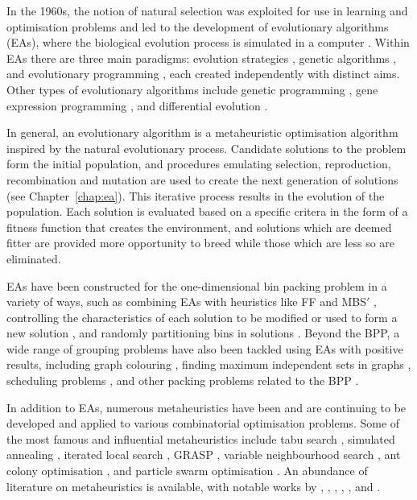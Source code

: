 \documentclass[a4paper,11pt]{article}
\begin{document}
In the 1960s, the notion of natural selection was exploited for use in learning and optimisation problems and led to the development of evolutionary algorithms (EAs), where the biological evolution process is simulated in a computer \citep{back1996, back1997}. Within EAs there are three main paradigms: evolution strategies \citep{schwefel1981}, genetic algorithms \citep{holland1962c, holland1962o, holland1975, goldberg1989}, and evolutionary programming \citep{fogel1966, fogel1995}, each created independently with distinct aims. Other types of evolutionary algorithms include genetic programming \citep{smith1980}, gene expression programming \citep{ferreira2001}, and differential evolution \citep{storn1997}.

In general, an evolutionary algorithm is a metaheuristic optimisation algorithm inspired by the natural evolutionary process. Candidate solutions to the problem form the initial population, and procedures emulating selection, reproduction, recombination and mutation are used to create the next generation of solutions (see Chapter~\ref{chap:ea}). This iterative process results in the evolution of the population. Each solution is evaluated based on a specific critera in the form of a fitness function that creates the environment, and solutions which are deemed fitter are provided more opportunity to breed while those which are less so are eliminated. 

EAs have been constructed for the one-dimensional bin packing problem in a variety of ways, such as combining EAs with heuristics like FF and MBS$'$ \citep{iima2003}, controlling the characteristics of each solution to be modified or used to form a new solution \citep{rohlfshagen2007, quiroz2015}, and randomly partitioning bins in solutions \citep{falkenauer1996}. Beyond the BPP, a wide range of grouping problems have also been tackled using EAs with positive results, including graph colouring \citep{galinier1999}, finding maximum independent sets in graphs \citep{hifi1997}, scheduling problems \citep{kammarti2013}, and other packing problems related to the BPP \citep{bortfeldt2006, kroger1995, lewis2017}.

In addition to EAs, numerous metaheuristics have been and are continuing to be developed and applied to various combinatorial optimisation problems. Some of the most famous and influential metaheuristics include tabu search \citep{glover1986}, simulated annealing \citep{kirkpatrick1983}, iterated local search \citep{lourenco2003}, GRASP \citep{feo1995}, variable neighbourhood search \citep{mladenovic1997}, ant colony optimisation \citep{dorigo1992}, and particle swarm optimisation \citep{kennedy1995}. An abundance of literature on metaheuristics is available, with notable works by \citet{bianchi2009}, \citet{blum2003}, \citet{glover2003}, \citet{mitchell1996}, \citet{sorensen2017}, and \citet{talbi2009}. 
\end{document}
